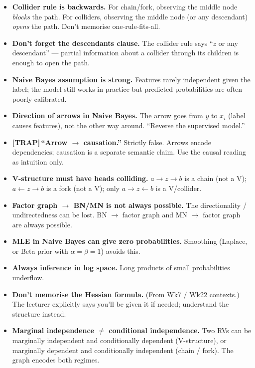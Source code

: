 \documentclass[11pt, a4paper]{article}
\newcommand{\trapflag}{\textcolor{trapBd}{\textbf{[TRAP]}}\,}
\begin{document}
\begin{itemize}
  \item \textbf{Collider rule is backwards.} For chain/fork, observing the middle node \emph{blocks} the path. For colliders, observing the middle node (or any descendant) \emph{opens} the path. Don't memorise one-rule-fits-all.
  \item \textbf{Don't forget the descendants clause.} The collider rule says ``$z$ or any descendant'' — partial information about a collider through its children is enough to open the path.
  \item \textbf{Naive Bayes assumption is strong.} Features rarely independent given the label; the model still works in practice but predicted probabilities are often poorly calibrated.
  \item \textbf{Direction of arrows in Naive Bayes.} The arrow goes from $y$ to $x_i$ (label causes features), not the other way around. ``Reverse the supervised model.''
  \item \trapflag{}\textbf{``Arrow $\to$ causation.''} Strictly false. Arrows encode dependencies; causation is a separate semantic claim. Use the causal reading as intuition only.
  \item \textbf{V-structure must have heads colliding.} $a \to z \to b$ is a chain (not a V); $a \leftarrow z \to b$ is a fork (not a V); only $a \to z \leftarrow b$ is a V/collider.
  \item \textbf{Factor graph $\to$ BN/MN is not always possible.} The directionality / undirectedness can be lost. BN $\to$ factor graph and MN $\to$ factor graph are always possible.
  \item \textbf{MLE in Naive Bayes can give zero probabilities.} Smoothing (Laplace, or Beta prior with $\alpha = \beta = 1$) avoids this.
  \item \textbf{Always inference in log space.} Long products of small probabilities underflow.
  \item \textbf{Don't memorise the Hessian formula.} (From Wk7 / Wk22 contexts.) The lecturer explicitly says you'll be given it if needed; understand the structure instead.
  \item \textbf{Marginal independence $\ne$ conditional independence.} Two RVs can be marginally independent and conditionally dependent (V-structure), or marginally dependent and conditionally independent (chain / fork). The graph encodes both regimes.
\end{itemize}

\end{document}
